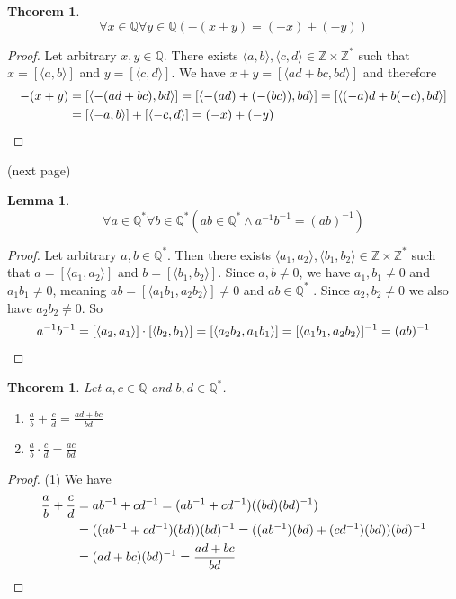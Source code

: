 \documentclass{report}
\newtheorem{theorem}[theo]{Theorem}
\newtheorem{lemma}[theo]{Lemma}
\begin{document}
\begin{theorem}
\begin{equation*}
\forall x\in\mathbb Q\forall y\in\mathbb Q(-(x+y)=(-x)+(-y))
\end{equation*}
\end{theorem}
\begin{proof}
Let arbitrary $x,y\in\mathbb Q$. There exists $\langle a,b\rangle,\langle c,d\rangle\in\mathbb Z\times\mathbb Z^*$ such that 
$x=[\langle a,b\rangle]$ and $y=[\langle c,d\rangle]$.
We have $x+y=[\langle ad+bc,bd\rangle]$ and therefore
\begin{align*}
-(x+y)&=[\langle-(ad+bc),bd\rangle]=[\langle-(ad)+(-(bc)),bd\rangle]
=[\langle(-a)d+b(-c),bd\rangle]\\
&=[\langle-a,b\rangle]+[\langle-c,d\rangle]=(-x)+(-y)\qedhere
\end{align*}
\end{proof}
\noindent(next page)\newpage
\begin{lemma}
\begin{equation*}
\forall a\in\mathbb Q^*\forall b\in\mathbb Q^*(ab\in\mathbb Q^*\land a^{-1}b^{-1}=(ab)^{-1})
\end{equation*}
\end{lemma}
\begin{proof}
Let arbitrary $a,b\in\mathbb Q^*$. Then there exists $\langle a_1,a_2\rangle,\langle b_1,b_2\rangle\in\mathbb Z\times\mathbb Z^*$ such that 
$a=[\langle a_1,a_2\rangle]$ and $b=[\langle b_1,b_2\rangle]$. Since $a,b\neq 0$, we have $a_1,b_1\neq0$ and $a_1b_1\neq0$, meaning $ab=[\langle a_1b_1,a_2b_2\rangle]\neq0$ and $ab\in\mathbb Q^*$
. Since $a_2,b_2\neq0$ we also have $a_2b_2\neq0$. So
\begin{equation*}
a^{-1}b^{-1}=[\langle a_2,a_1\rangle]\cdot[\langle b_2,b_1\rangle]=[\langle a_2b_2,a_1b_1\rangle]
=[\langle a_1b_1,a_2b_2\rangle]^{-1}=(ab)^{-1}\qedhere
\end{equation*}
\end{proof}
\begin{theorem}
Let $a,c\in\mathbb Q$ and $b,d\in\mathbb Q^*$. 
\begin{enumerate}
\item$\frac ab+\frac cd=\frac{ad+bc}{bd}$
\item$\frac ab\cdot\frac cd=\frac{ac}{bd}$
\end{enumerate}
\end{theorem}
\begin{proof}(1)
We have 
\begin{align*}
\frac ab+\frac cd&=ab^{-1}+cd^{-1}=(ab^{-1}+cd^{-1})((bd)(bd)^{-1})\\
&=((ab^{-1}+cd^{-1})(bd))(bd)^{-1}=((ab^{-1})(bd)+(cd^{-1})(bd))(bd)^{-1}\\
&=(ad+bc)(bd)^{-1}=\frac{ad+bc}{bd}\qedhere
\end{align*}
\end{proof}
\end{document}
